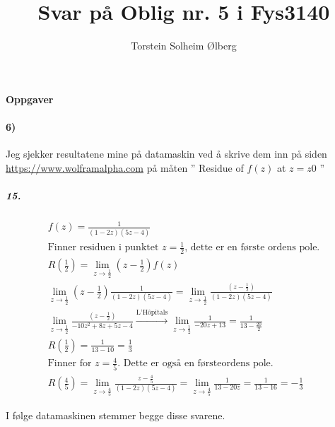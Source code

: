 \documentclass[11pt, A4paper,norsk]{article}
\author{Torstein Solheim Ølberg}
\title{Svar på Oblig nr. 5 i Fys3140}
\begin{document}
\maketitle
	\begin{center}
\Large \textbf{Oppgaver}
	\end{center}









		\paragraph{6)}
			\begin{flushleft}
Jeg sjekker resultatene mine på datamaskin ved å skrive dem inn på siden \url{https://www.wolframalpha.com} på måten '' Residue of $f(z)$ at $z = z0$ ''
			\end{flushleft}
			\subparagraph{15.}
				\begin{gather*}
f(z) = \frac{1}{(1 - 2z)(5z - 4)} \\
\text{Finner residuen i punktet $z = \frac{1}{2}$, dette er en første ordens pole.} \\
R\left( \frac{1}{2} \right) = \lim_{z \rightarrow \frac{1}{2}} \left( z - \frac{1}{2} \right) f(z) \\
\lim_{z \rightarrow \frac{1}{2}} \left( z - \frac{1}{2} \right)  \frac{1}{(1 - 2z)(5z - 4)} = \lim_{z \rightarrow \frac{1}{2}} \frac{\left( z - \frac{1}{2} \right)}{(1 - 2z)(5z - 4)} \\
\lim_{z \rightarrow \frac{1}{2}} \frac{\left( z - \frac{1}{2} \right)}{-10z^2 + 8z + 5z - 4} \xrightarrow{\text{L'Hôpitals}} \lim_{z \rightarrow \frac{1}{2}} \frac{1}{-20z + 13} = \frac{1}{13 - \frac{20}{2}} \\
R\left( \frac{1}{2} \right) = \frac{1}{13 - 10} = \frac{1}{3} \\
\text{Finner for $z = \frac{4}{5}$. Dette er også en førsteordens pole.} \\
R\left( \frac{4}{5} \right) = \lim_{z \rightarrow \frac{4}{5}} \frac{ z - \frac{4}{5}}{(1 - 2z)(5z - 4)} = \lim_{z \rightarrow \frac{4}{5}} \frac{1}{13 - 20z} = \frac{1}{13 - 16} = - \frac{1}{3}
				\end{gather*}
				\begin{flushleft}
I følge datamaskinen stemmer begge disse svarene.
				\end{flushleft}
\end{document}
